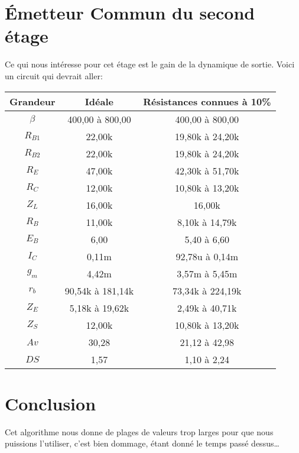   \section{Émetteur Commun du second étage}

  Ce qui nous intéresse pour cet étage est le gain de la dynamique de sortie.
  Voici un circuit qui devrait aller:
   \begin{tabular}{|c|c|c|}
    \hline
 Grandeur  & Idéale    &  Résistances connues à 10\% \\\hline
 $\beta$   &         400,00 à 800,00 &  400,00 à 800,00 \\\hline
 $R_{B1}$  &          22,00k     &   19,80k à 24,20k \\\hline
 $R_{B2}$  &          22,00k     &   19,80k à 24,20k \\\hline
 $R_E$  &          47,00k     &   42,30k à 51,70k \\\hline
 $R_C$  &          12,00k     &   10,80k à 13,20k \\\hline
 $Z_L$  &          16,00k     &        16,00k      \\\hline
 $R_B$  &          11,00k     &   8,10k à 14,79k  \\\hline
 $E_B$  &           6,00      &     5,40 à 6,60   \\\hline
 $I_C$  &          0,11m      &   92,78u à 0,14m  \\\hline
 $g_m$  &          4,42m      &    3,57m à 5,45m  \\\hline
 $r_b$  &    90,54k à 181,14k & 73,34k à 224,19k \\\hline
 $Z_E$  &     5,18k à 19,62k  &  2,49k à 40,71k  \\\hline
 $Z_S$  &          12,00k     &   10,80k à 13,20k \\\hline
 $Av$   &          30,28      &    21,12 à 42,98  \\\hline
 $DS$   &           1,57      &     1,10 à 2,24   \\\hline
\end{tabular}

\section{Conclusion}

Cet algorithme nous donne de plages de valeurs trop larges pour que
nous puissions l’utiliser, c’est bien dommage, étant donné le temps passé dessus…
